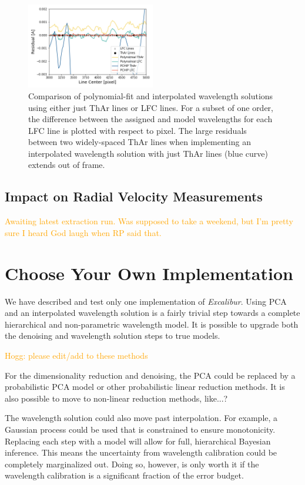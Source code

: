 \documentclass[modern]{aastex63}
\newcommand{\project}[1]{\textsl{#1}}
\newcommand{\name}{\project{Excalibur}}
\newcommand{\lz}[1]{\textcolor{orange}{#1}}
\begin{document}
\begin{figure}[t]
\centering
\includegraphics[width=0.5\textwidth]{Figures/lineDensity.png}
\caption{Comparison of polynomial-fit and interpolated wavelength solutions using either just ThAr lines or LFC lines.  For a subset of one order, the difference between the assigned and model wavelengths for each LFC line is plotted with respect to pixel.  The large residuals between two widely-spaced ThAr lines when implementing an interpolated wavelength solution with just ThAr lines (blue curve) extends out of frame.}
\label{fig:waveResids}
\end{figure} 

\subsection{Impact on Radial Velocity Measurements}\label{sec:test-rv}
\lz{Awaiting latest extraction run.  Was supposed to take a weekend, but I'm pretty sure I heard God laugh when RP said that.}


\section{Choose Your Own Implementation} \label{sec:choices}
We have described and test only one implementation of \name.  Using PCA and an interpolated wavelength solution is a fairly trivial step towards a complete hierarchical and non-parametric wavelength model.  It is possible to upgrade both the denoising and wavelength solution steps to true models.

\lz{Hogg: please edit/add to these methods}

For the dimensionality reduction and denoising, the PCA could be replaced by a probabilistic PCA model or other probabilistic linear reduction methods.  It is also possible to move to non-linear reduction methods, like...?

The wavelength solution could also move past interpolation.  For example, a Gaussian process could be used that is constrained to ensure monotonicity.  Replacing each step with a model will allow for full, hierarchical Bayesian inference.  This means the uncertainty from wavelength calibration could be completely marginalized out.  Doing so, however, is only worth it if the wavelength calibration is a significant fraction of the error budget.
\end{document}
